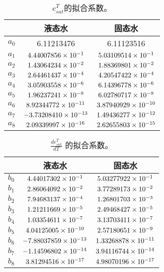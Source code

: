 \begin{table}[]
\centering
\caption{$e_{sat}^T$的拟合系数。}
\label{tab:e_sat_T的拟合系数}
\begin{tabular}{@{}lcc@{}}
\toprule
     &  液态水  & 固态水                         \\ \midrule
$a_0$ & 6.11213476        & 6.11123516       \\
$a_1$ & $\rm 4.44007856 \times 10^{-1}$   & $\rm 5.03109514 \times 10^{-1}$  \\
$a_2$ & $\rm 1.43064234 \times 10^{-2}$   & $\rm 1.88369801 \times 10^{-2}$  \\
$a_3$ & $\rm 2.64461437 \times 10^{-4}$   & $\rm 4.20547422 \times 10^{-4}$  \\
$a_4$ & $\rm 3.05903558 \times 10^{-6}$   & $\rm 6.14396778 \times 10^{-6}$  \\
$a_5$ & $\rm 1.96237241 \times 10^{-8}$   & $\rm 6.02780717 \times 10^{-8}$  \\
$a_6$ & $\rm 8.92344772 \times 10^{-11}$  & $\rm 3.87940929 \times 10^{-10}$ \\
$a_7$ & $\rm -3.73208410 \times 10^{-13}$ & $\rm 1.49436277 \times 10^{-12}$ \\
$a_8$ & $\rm 2.09339997 \times 10^{-16}$  & $\rm 2.62655803 \times 10^{-15}$ \\ \bottomrule
\end{tabular}
\end{table}

\begin{table}[]
\centering
\caption{$\frac{d e_{sat}^T}{d T}$ 的拟合系数。}
\label{tab:de_sat_dT的拟合系数}
\begin{tabular}{@{}lcc@{}}
\toprule
     &  液态水  & 固态水                         \\ \midrule
$b_0$ & $\rm 4.44017302 \times 10^{-1}$   & $\rm 5.03277922 \times 10^{-1}$  \\
$b_1$ & $\rm 2.86064092 \times 10^{-2}$  & $\rm 3.77289173 \times 10^{-2}$  \\
$b_2$ & $\rm 7.94683137 \times 10^{-4}$   & $\rm 1.26801703 \times 10^{-3}$  \\
$b_3$ & $\rm 1.21211669 \times 10^{-5}$   & $\rm 2.49468427 \times 10^{-5}$  \\
$b_4$ & $\rm 1.03354611 \times 10^{-7}$   & $\rm 3.13703411 \times 10^{-7}$  \\
$b_5$ & $\rm 4.04125005 \times 10^{-10}$  & $\rm 2.57180651 \times 10^{-9}$  \\
$b_6$ & $\rm -7.88037859 \times 10^{-13}$ & $\rm 1.33268878 \times 10^{-11}$ \\
$b_7$ & $\rm -1.14596802 \times 10^{-14}$ & $\rm 3.94116744 \times 10^{-14}$ \\
$b_8$ & $\rm 3.81294516 \times 10^{-17}$  & $\rm 4.98070196 \times 10^{-17}$ \\\bottomrule
\end{tabular}
\end{table}
